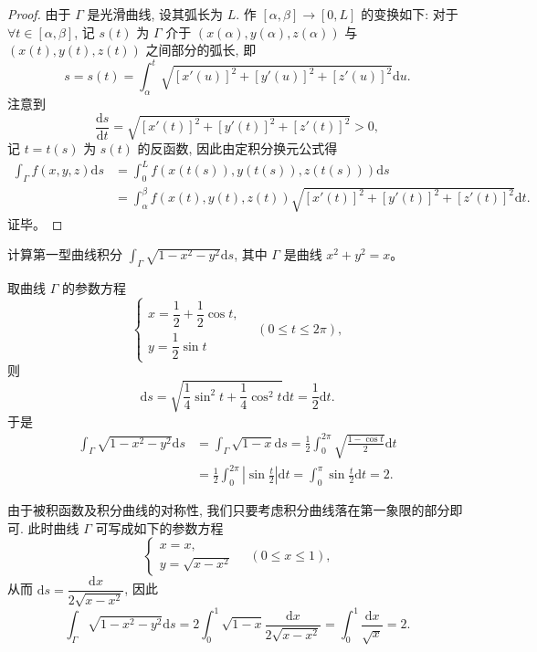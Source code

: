 \documentclass[12pt,fontset=fandol]{ctexart}
\begin{document}
\begin{proof}\quad 由于 $\Gamma$ 是光滑曲线, 设其弧长为 $L$. 作 $[\alpha,\beta]\to[0,L]$ 的变换如下: 对于 $\forall t\in[\alpha,\beta]$, 记 $s(t)$ 为 $\Gamma$ 介于 $(x(\alpha),y(\alpha),z(\alpha))$ 与 $(x(t),y(t),z(t))$ 之间部分的弧长, 即
\[
  s=s(t)=\int_\alpha^t \sqrt{[x'(u)]^2+[y'(u)]^2+[z'(u)]^2}\mathrm du.
\]
注意到
\[
  \frac{\mathrm ds}{\mathrm dt}
  =\sqrt{[x'(t)]^2+[y'(t)]^2+[z'(t)]^2}>0,
\]
记 $t=t(s)$ 为 $s(t)$ 的反函数, 因此由定积分换元公式得
\[
\begin{aligned}
  \int_\Gamma f(x,y,z)\mathrm ds
  &=\int_0^L f(x(t(s)),y(t(s)),z(t(s)))\mathrm ds\\
  &=\int_\alpha^\beta f(x(t),y(t),z(t))
    \sqrt{[x'(t)]^2+[y'(t)]^2+[z'(t)]^2}\mathrm dt.
\end{aligned}
\]
证毕。

\end{proof}
\begin{example}\label{course-example-16-1-1}\quad 计算第一型曲线积分 $\int_\Gamma \sqrt{1-x^2-y^2}\mathrm ds$, 其中 $\Gamma$ 是曲线 $x^2+y^2=x$。

\end{example}
\noindent{}\quad 取曲线 $\Gamma$ 的参数方程
\[
  \begin{cases}
    x=\dfrac12+\dfrac12\cos t,\\
    y=\dfrac12\sin t
  \end{cases}
  \quad(0\leqslant t\leqslant 2\pi),
\]
则
\[
  \mathrm ds=\sqrt{\frac14\sin^2t+\frac14\cos^2t}\mathrm dt
  =\frac12\mathrm dt.
\]
于是
\[
\begin{aligned}
  \int_\Gamma \sqrt{1-x^2-y^2}\mathrm ds
  &=\int_\Gamma \sqrt{1-x}\mathrm ds
    =\frac12\int_0^{2\pi}\sqrt{\frac{1-\cos t}{2}}\mathrm dt\\
  &=\frac12\int_0^{2\pi}\left|\sin\frac t2\right|\mathrm dt
    =\int_0^\pi\sin\frac t2\mathrm dt=2.
\end{aligned}
\]

\noindent{}\quad 由于被积函数及积分曲线的对称性, 我们只要考虑积分曲线落在第一象限的部分即可. 此时曲线 $\Gamma$ 可写成如下的参数方程
\[
  \begin{cases}
    x=x,\\
    y=\sqrt{x-x^2}
  \end{cases}
  \quad(0\leqslant x\leqslant1),
\]
从而 $\mathrm ds=\dfrac{\mathrm dx}{2\sqrt{x-x^2}}$, 因此
\[
  \int_\Gamma \sqrt{1-x^2-y^2}\mathrm ds
  =2\int_0^1\sqrt{1-x}\frac{\mathrm dx}{2\sqrt{x-x^2}}
  =\int_0^1\frac{\mathrm dx}{\sqrt x}=2.
\]
\end{document}
